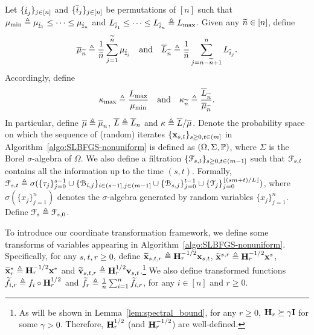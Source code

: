 \documentclass[10pt,twocolumn,journal]{IEEEtran}
\begin{document}
Let $\{\underline{i}_j\}_{j\in[n]}$ and $\{\overline{i}_j\}_{j\in[n]}$ be permutations of $[n]$ such that $\mu_{\min}\triangleq\mu_{\underline{i}_1}\le \cdots\le \mu_{\underline{i}_n}$ and $L_{\overline{i}_1}\le \cdots\le L_{\overline{i}_n} \triangleq L_{\max}$. Given any $\widetilde{n}\in[n]$, define 
\begin{align}
\overline{\mu}_{\widetilde{n}}\triangleq \frac{1}{\widetilde{n}}\sum_{j=1}^{\widetilde{n}} \mu_{\underline{i}_j} \quad\mbox{and}\quad \overline{L}_{\widetilde{n}}\triangleq \frac{1}{\widetilde{n}}\sum_{j=n-\widetilde{n}+1}^n L_{\overline{i}_j}. \label{eq:def_mu_L}
\end{align}
Accordingly, define  
\begin{equation}
\kappa_{\max}\triangleq \frac{L_{\max}}{\mu_{\min}}\quad\mbox{and}\quad \kappa_{\widetilde{n}}\triangleq \frac{\overline{L}_{\widetilde{n}}}{\overline{\mu}_{\widetilde{n}}}. \label{eq:def_kappa} 
\end{equation}
In particular, define $\overline{\mu}\triangleq \overline{\mu}_n$, $\overline{L}\triangleq \overline{L}_n$ and $\kappa\triangleq\overline{L}/\overline{\mu}$. 
Denote the probability space on which the sequence of (random) iterates $\{\mathbf{x}_{s,t}\}_{s\ge 0,t\in(m]}$ in Algorithm~\ref{algo:SLBFGS-nonuniform} is defined as $(\Omega,\Sigma,\mathbb{P})$, where $\Sigma$ is the Borel $\sigma$-algebra of $\Omega$.  
We also define a filtration $\{\mathcal{F}_{s,t}\}_{s\ge 0,t\in(m-1]}$ such that $\mathcal{F}_{s,t}$ contains all the information up to the time $(s,t)$. Formally, $\mathcal{F}_{s,t}\triangleq \sigma(\{\tau_j\}_{j=0}^{s-1}\cup\{\mathcal{B}_{i,j}\}_{i\in (s-1],j\in(m-1]}\cup\{\mathcal{B}_{s,j}\}_{j=0}^{t-1}\cup\{\mathcal{T}_j\}_{j=0}^{\lfloor{(sm+t)/L}\rfloor})$, 
where $\sigma\left(\{x_j\}_{j=1}^n\right)$ denotes the $\sigma$-algebra generated by random variables $\{x_j\}_{j=1}^n$. %
Define $\mathcal{F}_s\triangleq \mathcal{F}_{s,0}$. %

To introduce our coordinate transformation framework, we define some transforms of variables appearing in Algorithm~\ref{algo:SLBFGS-nonuniform}. Specifically, for any $s,t,r\ge 0$, 
define $\widetilde{\mathbf{x}}_{s,t,r}\triangleq \mathbf{H}_r^{-1/2}\mathbf{x}_{s,t}$, $\widetilde{\mathbf{x}}^{s,r}\triangleq \mathbf{H}_r^{-1/2}\mathbf{x}^{s}$, $\widetilde{\mathbf{x}}_r^*\triangleq \mathbf{H}_r^{-1/2}\mathbf{x}^*$ and $\widetilde{\mathbf{v}}_{s,t,r}\triangleq \mathbf{H}_r^{1/2}\mathbf{v}_{s,t}$.\footnote{As will be shown in Lemma~\ref{lem:spectral_bound}, for any $r\ge 0$, $\mathbf{H}_r\succeq\gamma\mathbf{I}$ for some $\gamma>0$. Therefore, $\mathbf{H}_r^{1/2}$ (and $\mathbf{H}_r^{-1/2}$) are well-defined.} We also define transformed functions $\widetilde{f}_{i,r}\triangleq f_i\circ\mathbf{H}_r^{1/2}$ and $\widetilde{f}_r\triangleq \frac{1}{n}\sum_{i=1}^n \widetilde{f}_{i,r}$, for any $i\in[n]$ and $r\ge 0$. %
\end{document}

